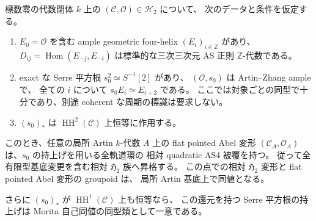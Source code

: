 \begin{proposition}
\label{prop:cubic-artin-hhtrivial-conditional}
標数零の代数閉体 $k$ 上の $(\mathcal C,\mathcal O)\in\mathcal H_2$ について、
次のデータと条件を仮定する。
\begin{enumerate}
\item $E_0=\mathcal O$ を含む ample geometric four-helix $(E_i)_{i\in\mathbb Z}$ があり、
  $D_{ij}=\operatorname{Hom}(E_{-j},E_{-i})$ は標準的な三次三次元 AS 正則
  $\mathbb Z$-代数である。
\item exact な Serre 平方根 $s_0^2\simeq S^{-1}[2]$ があり、
  $(\mathcal O,s_0)$ は Artin--Zhang ample で、
  全ての $i$ について $s_0E_i\simeq E_{i+2}$ である。
  ここでは対象ごとの同型で十分であり、別途 coherent な周期の標識は要求しない。
\item $(s_0)_*$ は $\operatorname{HH}^2(\mathcal C)$ 上恒等に作用する。
\end{enumerate}
このとき、任意の局所 Artin $k$-代数 $A$ 上の flat pointed Abel 変形
$(\mathcal C_A,\mathcal O_A)$ は、$s_0$ の持上げを用いる全軌道環の
相対 quadratic AS4 被覆を持つ。
従って全有限型基底変更を含む相対 $\mathfrak H_2$ 族へ昇格する。
この点での相対 $\mathfrak H_2$ 変形と flat pointed Abel 変形の groupoid は、
局所 Artin 基底上で同値となる。

さらに $(s_0)_*$ が $\operatorname{HH}^1(\mathcal C)$ 上も恒等なら、
この還元を持つ Serre 平方根の持上げは Morita 自己同値の同型類として一意である。
\end{proposition}
